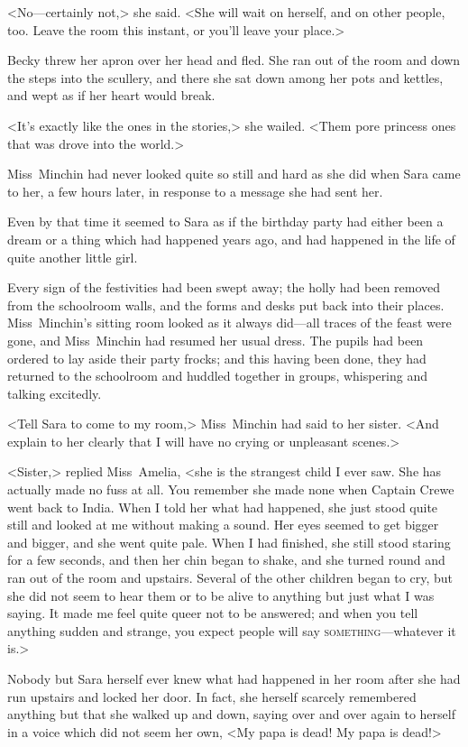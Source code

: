 <No—certainly not,> she said. <She will wait on herself, and on other people, too. Leave the room this instant, or you'll leave your place.>

Becky threw her apron over her head and fled. She ran out of the room and down the steps into the scullery, and there she sat down among her pots and kettles, and wept as if her heart would break.

<It's exactly like the ones in the stories,> she wailed. <Them pore princess ones that was drove into the world.>

Miss~Minchin had never looked quite so still and hard as she did when Sara came to her, a few hours later, in response to a message she had sent her.

Even by that time it seemed to Sara as if the birthday party had either been a dream or a thing which had happened years ago, and had happened in the life of quite another little girl.

Every sign of the festivities had been swept away; the holly had been removed from the schoolroom walls, and the forms and desks put back into their places. Miss~Minchin's sitting room looked as it always did—all traces of the feast were gone, and Miss~Minchin had resumed her usual dress. The pupils had been ordered to lay aside their party frocks; and this having been done, they had returned to the schoolroom and huddled together in groups, whispering and talking excitedly.

<Tell Sara to come to my room,> Miss~Minchin had said to her sister. <And explain to her clearly that I will have no crying or unpleasant scenes.>

<Sister,> replied Miss~Amelia, <she is the strangest child I ever saw. She has actually made no fuss at all. You remember she made none when Captain Crewe went back to India. When I told her what had happened, she just stood quite still and looked at me without making a sound. Her eyes seemed to get bigger and bigger, and she went quite pale. When I had finished, she still stood staring for a few seconds, and then her chin began to shake, and she turned round and ran out of the room and upstairs. Several of the other children began to cry, but she did not seem to hear them or to be alive to anything but just what I was saying. It made me feel quite queer not to be answered; and when you tell anything sudden and strange, you expect people will say \textsc{something}—whatever it is.>

Nobody but Sara herself ever knew what had happened in her room after she had run upstairs and locked her door. In fact, she herself scarcely remembered anything but that she walked up and down, saying over and over again to herself in a voice which did not seem her own, <My papa is dead! My papa is dead!>

